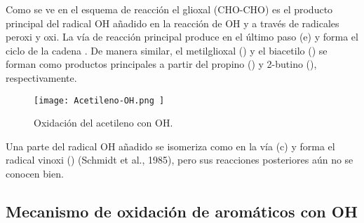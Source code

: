 {Como se ve en el esquema de reacción  el glioxal (CHO-CHO) es el producto principal del radical OH añadido en la reacción de OH y  a través de radicales peroxi y oxi. La vía de reacción principal produce  en el último paso (e) y forma el ciclo de la cadena . De manera similar, el metilglioxal () y el biacetilo () se forman como productos principales a partir del propino () y 2-butino (), respectivamente.
\begin{figure}[htbp]
\begin{center}
\texttt{[image: Acetileno-OH.png ]}
\caption{Oxidación del acetileno con OH.}
\label{acetOH}
\end{center}
\end{figure}

Una parte del radical OH añadido se isomeriza como en la vía (c) y forma el radical vinoxi () (Schmidt et al., 1985), pero sus reacciones posteriores aún no se conocen bien.

\subsection{Mecanismo de oxidaci\'on de arom\'aticos con OH}

}
